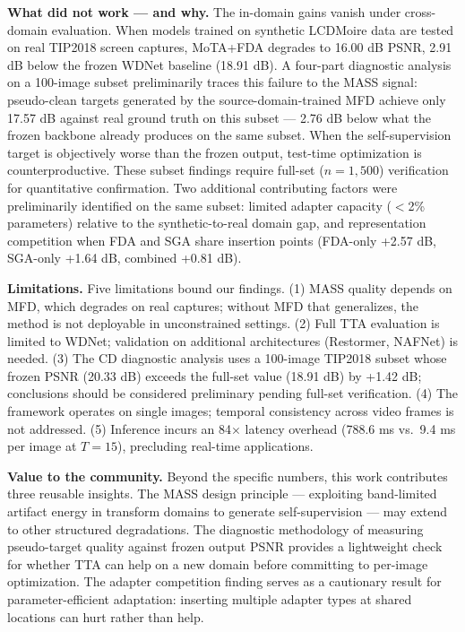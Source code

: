 \documentclass[review,10pt]{elsarticle}
\begin{document}
\textbf{What did not work --- and why.} The in-domain gains vanish under cross-domain evaluation. When models trained on synthetic LCDMoire data are tested on real TIP2018 screen captures, MoTA+FDA degrades to 16.00 dB PSNR, 2.91 dB below the frozen WDNet baseline (18.91 dB). A four-part diagnostic analysis on a 100-image subset preliminarily traces this failure to the MASS signal: pseudo-clean targets generated by the source-domain-trained MFD achieve only 17.57 dB against real ground truth on this subset --- 2.76 dB below what the frozen backbone already produces on the same subset. When the self-supervision target is objectively worse than the frozen output, test-time optimization is counterproductive. These subset findings require full-set ($n=1,500$) verification for quantitative confirmation. Two additional contributing factors were preliminarily identified on the same subset: limited adapter capacity ($<$2\% parameters) relative to the synthetic-to-real domain gap, and representation competition when FDA and SGA share insertion points (FDA-only +2.57 dB, SGA-only +1.64 dB, combined +0.81 dB).

\textbf{Limitations.} Five limitations bound our findings. (1) MASS quality depends on MFD, which degrades on real captures; without MFD that generalizes, the method is not deployable in unconstrained settings. (2) Full TTA evaluation is limited to WDNet; validation on additional architectures (Restormer, NAFNet) is needed. (3) The CD diagnostic analysis uses a 100-image TIP2018 subset whose frozen PSNR (20.33 dB) exceeds the full-set value (18.91 dB) by +1.42 dB; conclusions should be considered preliminary pending full-set verification. (4) The framework operates on single images; temporal consistency across video frames is not addressed. (5) Inference incurs an 84$\times$ latency overhead (788.6 ms vs.\ 9.4 ms per image at $T{=}15$), precluding real-time applications.

\textbf{Value to the community.} Beyond the specific numbers, this work contributes three reusable insights. The MASS design principle --- exploiting band-limited artifact energy in transform domains to generate self-supervision --- may extend to other structured degradations. The diagnostic methodology of measuring pseudo-target quality against frozen output PSNR provides a lightweight check for whether TTA can help on a new domain before committing to per-image optimization. The adapter competition finding serves as a cautionary result for parameter-efficient adaptation: inserting multiple adapter types at shared locations can hurt rather than help.
\end{document}
